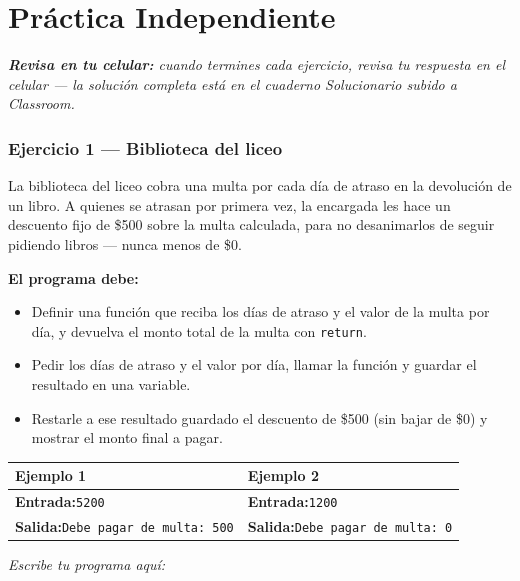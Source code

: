 \documentclass[11pt]{article}
\begin{document}
\section*{Práctica Independiente}

\textit{\textbf{Revisa en tu celular:} cuando termines cada ejercicio, revisa tu respuesta en el celular --- la solución completa está en el cuaderno Solucionario subido a Classroom.}

\vspace{2mm}

\subsubsection*{Ejercicio 1 --- Biblioteca del liceo}
La biblioteca del liceo cobra una multa por cada día de atraso en la devolución de un libro. A quienes se atrasan por primera vez, la encargada les hace un descuento fijo de \$500 sobre la multa calculada, para no desanimarlos de seguir pidiendo libros --- nunca menos de \$0.

\textbf{El programa debe:}
\begin{itemize}
  \item Definir una función que reciba los días de atraso y el valor de la multa por día, y devuelva el monto total de la multa con \texttt{return}.
  \item Pedir los días de atraso y el valor por día, llamar la función y guardar el resultado en una variable.
  \item Restarle a ese resultado guardado el descuento de \$500 (sin bajar de \$0) y mostrar el monto final a pagar.
\end{itemize}
\vspace{1mm}
\noindent\begin{tabularx}{\linewidth}{|X|X|}
\hline
\textbf{Ejemplo 1} & \textbf{Ejemplo 2} \\
\hline
\textbf{Entrada:}\newline \texttt{5}\newline \texttt{200} & \textbf{Entrada:}\newline \texttt{1}\newline \texttt{200} \\
\hline
\textbf{Salida:}\newline \texttt{Debe pagar de multa: 500} & \textbf{Salida:}\newline \texttt{Debe pagar de multa: 0} \\
\hline
\end{tabularx}
\vspace{1mm}
\vspace{2mm}\textit{Escribe tu programa aquí:}\vspace{1mm}
\end{document}
